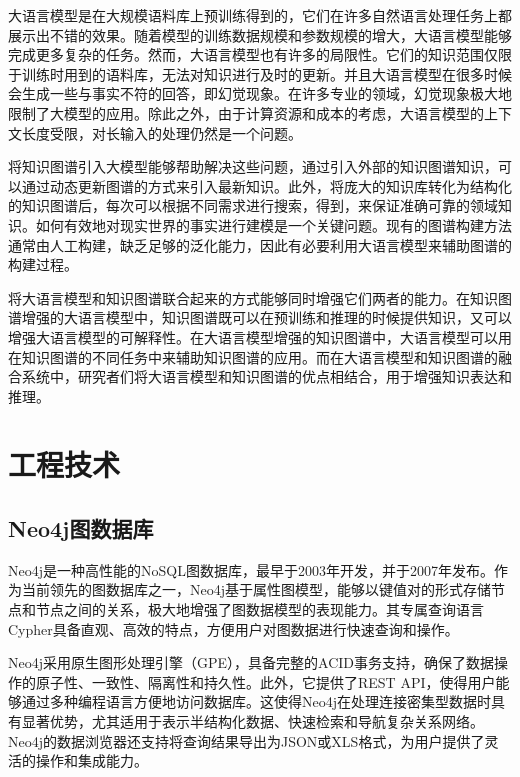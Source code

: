 大语言模型是在大规模语料库上预训练得到的，它们在许多自然语言处理任务上都展示出不错的效果。随着模型的训练数据规模和参数规模的增大，大语言模型能够完成更多复杂的任务。然而，大语言模型也有许多的局限性。它们的知识范围仅限于训练时用到的语料库\cite{AlKhamissi2022}，无法对知识进行及时的更新。并且大语言模型在很多时候会生成一些与事实不符的回答\cite{Ji2023}，即幻觉现象。在许多专业的领域，幻觉现象极大地限制了大模型的应用。除此之外，由于计算资源和成本的考虑，大语言模型的上下文长度受限，对长输入的处理仍然是一个问题。

将知识图谱引入大模型能够帮助解决这些问题，通过引入外部的知识图谱知识，可以通过动态更新图谱的方式来引入最新知识。此外，将庞大的知识库转化为结构化的知识图谱后，每次可以根据不同需求进行搜索，得到，来保证准确可靠的领域知识。如何有效地对现实世界的事实进行建模是一个关键问题。现有的图谱构建方法通常由人工构建，缺乏足够的泛化能力，因此有必要利用大语言模型来辅助图谱的构建过程。

将大语言模型和知识图谱联合起来的方式能够同时增强它们两者的能力。在知识图谱增强的大语言模型中，知识图谱既可以在预训练和推理的时候提供知识\cite{Zhang2019}，又可以增强大语言模型的可解释性\cite{Lin2019}。在大语言模型增强的知识图谱中，大语言模型可以用在知识图谱的不同任务中来辅助知识图谱的应用。而在大语言模型和知识图谱的融合系统中，研究者们将大语言模型和知识图谱的优点相结合，用于增强知识表达\cite{Yasunaga2022}和推理\cite{Choudhary2023}。

\section{工程技术}

\subsection{Neo4j图数据库}

Neo4j是一种高性能的NoSQL图数据库，最早于2003年开发，并于2007年发布。作为当前领先的图数据库之一，Neo4j基于属性图模型，能够以键值对的形式存储节点和节点之间的关系，极大地增强了图数据模型的表现能力。其专属查询语言Cypher具备直观、高效的特点，方便用户对图数据进行快速查询和操作。

Neo4j采用原生图形处理引擎（GPE），具备完整的ACID事务支持，确保了数据操作的原子性、一致性、隔离性和持久性。此外，它提供了REST API，使得用户能够通过多种编程语言方便地访问数据库。这使得Neo4j在处理连接密集型数据时具有显著优势，尤其适用于表示半结构化数据、快速检索和导航复杂关系网络。Neo4j的数据浏览器还支持将查询结果导出为JSON或XLS格式，为用户提供了灵活的操作和集成能力。 

